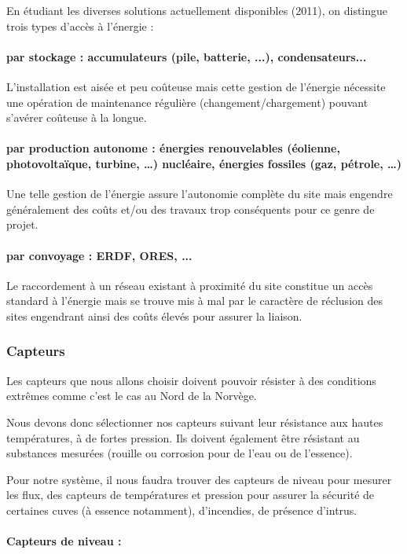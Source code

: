 \documentclass{mise_en_page}
\begin{document}
En étudiant les diverses solutions actuellement disponibles (2011), on
distingue trois types d’accès à l’énergie :

\paragraph{par stockage : accumulateurs (pile, batterie, ...),
condensateurs...}
L’installation est aisée et peu coûteuse mais cette gestion de l’énergie
nécessite une opération de maintenance régulière
(changement/chargement) pouvant s’avérer coûteuse à la longue.

\paragraph{par production autonome : énergies renouvelables (éolienne,
photovoltaïque, turbine, …) nucléaire, énergies fossiles (gaz, pétrole,
…)}
Une telle gestion de l’énergie assure l’autonomie complète du site mais
engendre généralement des coûts et/ou des travaux trop conséquents pour
ce genre de projet.

\paragraph{par convoyage : ERDF, ORES, ...}

Le raccordement à un réseau existant à proximité du site constitue un
accès standard à l’énergie mais se trouve mis à mal par le caractère de
réclusion des sites engendrant ainsi des coûts élevés pour assurer la
liaison.

\subsubsection{Capteurs}
Les capteurs que nous allons choisir doivent pouvoir résister à des
conditions extrêmes comme c’est le cas au Nord de la Norvège.

Nous devons donc sélectionner nos capteurs suivant leur résistance aux
hautes températures, à de fortes pression. Ils doivent également être
résistant au substances mesurées (rouille ou corrosion pour de l’eau ou
de l’essence).

Pour notre système, il nous faudra trouver des capteurs de niveau pour
mesurer les flux, des capteurs de températures et pression pour assurer
la sécurité de certaines cuves (à essence notamment), d’incendies, de
présence d’intrus.

\paragraph{Capteurs de niveau :}
\end{document}
